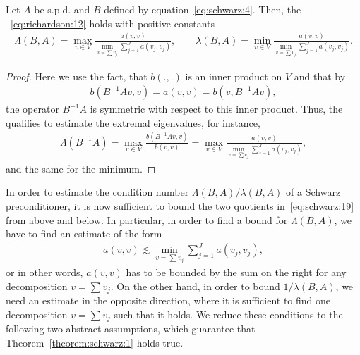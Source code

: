 \begin{theorem}
  \label{theorem:schwarz:1}
  Let $A$ be s.p.d. and $B$ defined by
  equation~\eqref{eq:schwarz:4}. Then, the ~\eqref{eq:richardson:12} holds with
  positive constants
  \begin{gather}
    \label{eq:schwarz:19}
    \Lambda(B,A) = \max_{v\in V} \frac{a(v,v)}{\min\limits_{v=\sum v_j}
      \sum\limits_{j=1}^J a(v_j, v_j)}
    ,\qquad
    \lambda(B,A) = \min\limits_{v\in V} \frac{a(v,v)}{\min\limits_{v=\sum v_j}
      \sum\limits_{j=1}^J a(v_j, v_j)}.
  \end{gather}
\end{theorem}

\begin{proof}
  Here we use the fact, that $b(.,.)$ is an inner product on
  $V$ and that by
  \begin{gather*}
    b(B^{-1}A v,v) = a(v,v) = b(v, B^{-1}A v),
  \end{gather*}
  the operator $B^{-1}A$ is symmetric with respect to this inner
  product. Thus, the  qualifies to
  estimate the extremal eigenvalues, for instance,
  \begin{gather*}
    \Lambda(B^{-1}A)
    = \max_{v\in V} \frac{b(B^{-1}A v,v)}{b(v,v)}
    = \max_{v\in V} \frac{a(v,v)}{\min\limits_{v=\sum v_j}
      \sum\limits_{j=1}^J a(v_j, v_j)},
  \end{gather*}
  and the same for the minimum.
\end{proof}

\begin{note}
  \label{note:schwarz:1}
  In order to estimate the condition number $\Lambda(B,A)/\lambda(B,A)$ of a Schwarz
  preconditioner, it is now sufficient to bound the two quotients
  in~\eqref{eq:schwarz:19} from above and below. In particular, in
  order to find a bound for $\Lambda(B,A)$, we have to find an estimate of
  the form
  \begin{gather}
    \label{eq:schwarz:23}
    a(v,v) \lesssim \min_{v=\sum v_j}\sum_{j=1}^J a(v_j, v_j),
  \end{gather}
  or in other words, $a(v,v)$ has to be bounded by the sum on the
  right for any decomposition $v=\sum v_j$. On the other hand, in
  order to bound $1/\lambda(B,A)$, we need an estimate in the opposite direction,
  where it is sufficient to find one decomposition $v=\sum v_j$ such
  that it holds. We reduce these
  conditions to the following two abstract assumptions, which guarantee that
  Theorem~\ref{theorem:schwarz:1} holds true.
\end{note}


